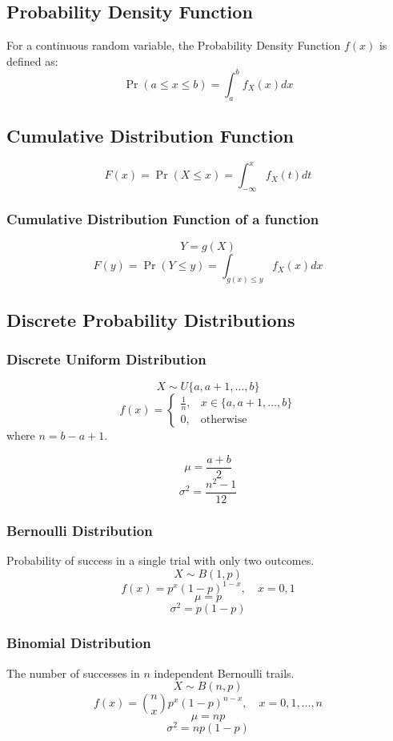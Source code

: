 \documentclass{article}
\begin{document}
\subsection{Probability Density Function}
For a continuous random variable, the Probability Density Function \( f(x) \) is defined as:
\[
    \Pr(a \le x \le b) = \int_{a}^{b} f_X(x)dx
\]

\subsection{Cumulative Distribution Function}
\[
    F(x) = \Pr(X \le x) = \int_{-\infty}^{x} f_X(t)dt
\]

\subsubsection{Cumulative Distribution Function of a function}
\[
    Y=g(X)
\]
\[
    F(y) = \Pr(Y \le y) = \int_{g(x) \le y} f_X(x)dx
\]

\subsection{Discrete Probability Distributions}

\subsubsection{Discrete Uniform Distribution}
\[
    X \sim U\{a, a+1, \dots, b\}
\]
\[
    f(x) =
    \begin{cases}
        \frac{1}{n}, & x \in \{a, a+1, \dots, b\} \\
        0, & \text{otherwise}
    \end{cases}
\]
where $n = b - a + 1$.

\[
    \mu = \frac{a + b}{2}
\]
\[
    \sigma^2 = \frac{n^2 - 1}{12}
\]

\subsubsection{Bernoulli Distribution}
Probability of success in a single trial with only two outcomes.
\[ X \sim B(1,p) \]
\[ f(x) = p^x (1-p)^{1-x}, \quad x=0,1 \]
\[ \mu = p \]
\[ \sigma^2 = p(1-p) \]

\subsubsection{Binomial Distribution}
The number of successes in \( n \) independent Bernoulli trails.
\[ X \sim B(n,p) \]
\[ f(x) = \binom{n}{x} p^x (1-p)^{n-x}, \quad x=0,1,\dots,n \]
\[ \mu = np \]
\[ \sigma^2 = np(1-p) \]
\end{document}
